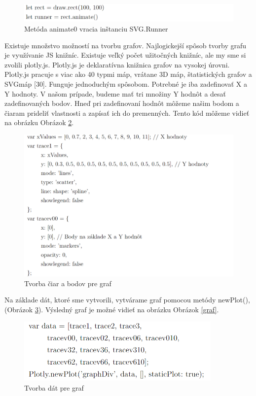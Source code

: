 \begin{figure}[!htbp]
    \centering
    \includegraphics[width=15cm]{img/alg5.PNG}
    \caption{Metóda animate0 vracia inštanciu SVG.Runner}
    \label{alg5}
\end{figure}

Existuje množstvo možností na tvorbu grafov. Najlogickejší spôsob tvorby grafu je využívanie JS knižníc. Existuje veľký počet užitočných knižníc, ale my sme si zvolili plotly.js. Plotly.js je deklaratívna knižnica grafov na vysokej úrovni. Plotly.js pracuje s viac ako 40 typmi máp, vrátane 3D máp, štatistických grafov a \acrshort{SVG}máp [30]. Funguje jednoduchým spôsobom. Potrebné je iba zadefinovať X a Y hodnoty. V našom prípade, budeme mať tri množiny Y hodnôt a desať zadefinovaných bodov. Hneď pri zadefinovaní hodnôt môžeme našim bodom a čiaram prideliť vlastnosti a zapísať ich do premenných. Tento kód môžeme vidieť na obrázku Obrázok \ref{alg6}. 

\begin{figure}[!htbp]
    \centering
    \includegraphics[width=15cm]{img/alg6.PNG}
    \caption{Tvorba čiar a bodov pre graf}
    \label{alg6}
\end{figure}

\newpage \noindent Na základe dát, ktoré sme vytvorili, vytvárame graf pomocou metódy newPlot(), (Obrázok \ref{alg7}). Výsledný graf je možné vidieť na obrázku Obrázok \ref{graf}.

\begin{figure}[!htbp]
    \centering
    \includegraphics[width=10cm]{img/alg7.PNG}
    \caption{Tvorba dát pre graf}
    \label{alg7}
\end{figure}

